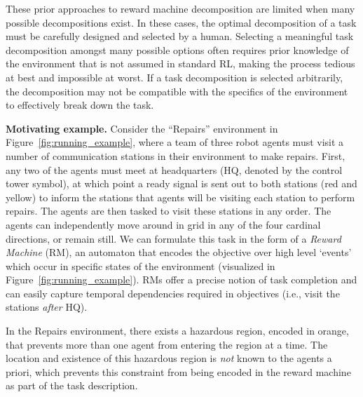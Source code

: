 These prior approaches to reward machine decomposition are limited when many possible decompositions exist. In these cases, the optimal decomposition of a task must be carefully designed and selected by a human. Selecting a meaningful task decomposition amongst many possible options often requires prior knowledge of the environment that is not assumed in standard RL, making the process tedious at best and impossible at worst. If a task decomposition is selected arbitrarily, the decomposition may not be compatible with the specifics of the environment to effectively break down the task. 

\textbf{Motivating example.} Consider the ``Repairs'' environment in Figure~\ref{fig:running_example}, where a team of three robot agents must visit a number of communication stations in their environment to make repairs. First, any two of the agents must meet at headquarters (HQ, denoted by the control tower symbol), at which point a ready signal is sent out to both stations (red and yellow) to inform the stations that agents will be visiting each station to perform repairs. The agents are then tasked to visit these stations in any order. The agents can independently move around in grid in any of the four cardinal directions, or remain still.  We can formulate this task in the form of a \textit{Reward Machine} (RM), an automaton that encodes the objective over high level `events' which occur in specific states of the environment (visualized in Figure~\ref{fig:running_example}). RMs offer a precise notion of task completion and can easily capture temporal dependencies required in objectives (i.e., visit the stations \textit{after} HQ).

In the Repairs environment, there exists a hazardous region, encoded in orange, that prevents more than one agent from entering the region at a time. %
The location and existence of this hazardous region is \textit{not} known to the agents a priori, which prevents this constraint from being encoded in the reward machine as part of the task description.


